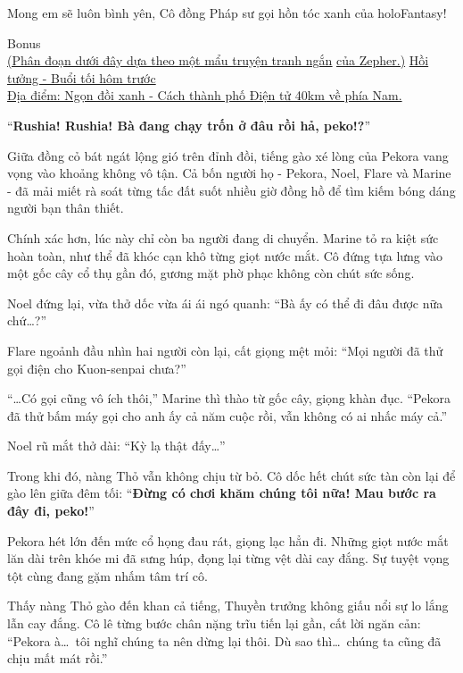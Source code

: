 \documentclass[../main.tex]{subfiles}
\begin{document}
Mong em sẽ luôn bình yên, Cô đồng Pháp sư gọi hồn tóc xanh của holoFantasy!

\begin{center}
    {\abv Bonus}\\
    \uline{(Phân đoạn dưới đây dựa theo }\href{https://danbooru.donmai.us/posts/5455769?q=parent%3A5455769}{\uline{một mẩu truyện tranh ngắn}} \uline{của Zepher.)}
    \pov{-}
    \uline{Hồi tưởng - Buổi tối hôm trước\\Địa điểm: Ngọn đồi xanh - Cách thành phố Điện tử 40km về phía Nam.}
\end{center}

``\textbf{Rushia! Rushia! Bà đang chạy trốn ở đâu rồi hả, peko!?}''

Giữa đồng cỏ bát ngát lộng gió trên đỉnh đồi, tiếng gào xé lòng của Pekora vang vọng vào khoảng không vô tận. Cả bốn người họ - Pekora, Noel, Flare và Marine - đã mải miết rà soát từng tấc đất suốt nhiều giờ đồng hồ để tìm kiếm bóng dáng người bạn thân thiết.

Chính xác hơn, lúc này chỉ còn ba người đang di chuyển. Marine tỏ ra kiệt sức hoàn toàn, như thể đã khóc cạn khô từng giọt nước mắt. Cô đứng tựa lưng vào một gốc cây cổ thụ gần đó, gương mặt phờ phạc không còn chút sức sống.

Noel đứng lại, vừa thở dốc vừa ái ái ngó quanh: ``Bà ấy có thể đi đâu được nữa chứ\dots?''

Flare ngoảnh đầu nhìn hai người còn lại, cất giọng mệt mỏi: ``Mọi người đã thử gọi điện cho Kuon-senpai chưa?''

``\dots Có gọi cũng vô ích thôi,'' Marine thì thào từ gốc cây, giọng khàn đục. ``Pekora đã thử bấm máy gọi cho anh ấy cả năm cuộc rồi, vẫn không có ai nhấc máy cả.''

Noel rũ mắt thở dài: ``Kỳ lạ thật đấy\dots''

Trong khi đó, nàng Thỏ vẫn không chịu từ bỏ. Cô dốc hết chút sức tàn còn lại để gào lên giữa đêm tối: ``\textbf{Đừng có chơi khăm chúng tôi nữa! Mau bước ra đây đi, peko!}''

Pekora hét lớn đến mức cổ họng đau rát, giọng lạc hẳn đi. Những giọt nước mắt lăn dài trên khóe mi đã sưng húp, đọng lại từng vệt dài cay đắng. Sự tuyệt vọng tột cùng đang gặm nhấm tâm trí cô.

Thấy nàng Thỏ gào đến khan cả tiếng, Thuyền trưởng không giấu nổi sự lo lắng lẫn cay đắng. Cô lê từng bước chân nặng trĩu tiến lại gần, cất lời ngăn cản: ``Pekora à\dots\ tôi nghĩ chúng ta nên dừng lại thôi. Dù sao thì\dots\ chúng ta cũng đã chịu mất mát rồi.''
\end{document}
